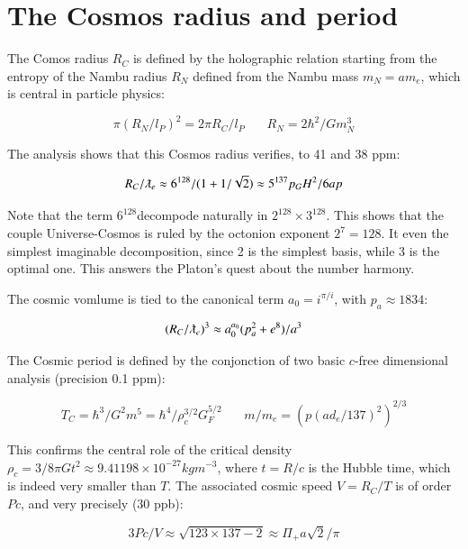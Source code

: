 \documentclass[a4paper,9pt]{article}
\begin{document}
\section{The Cosmos radius and period}

The Comos radius $R_C$ is defined by the holographic relation starting from the entropy of the Nambu radius $R_N$ defined from the Nambu mass $m_N = am_e$, which is central in particle physics:

\begin{equation}
\pi (R_N/l_P)^2 = 2\pi R_C/l_P ~~~~~~~~   R_N = 2\hbar^2/ Gm_N^3
\end{equation}

The analysis shows that this Cosmos radius verifies, to 41 and 38 ppm:

\begin{equation}
R_C/\lambdabar_e \approx 6^{128}/(1+1/\sqrt2) \approx 5^{137} p_GH^2/6ap
\end{equation}

Note that the term $6^{128}$decompode naturally in $2^{128} \times 3^{128}$. This shows that the couple Universe-Cosmos is ruled by the octonion exponent $2^7 = 128$. It even the simplest imaginable decomposition, since 2 is the simplest basis, while 3 is the optimal one. This answers the Platon's quest about the number harmony. 


The cosmic vomlume is tied to the canonical term $a_0 = i^{\pi/i}$, with $p_a\approx 1834$:

\begin{equation}
(R_C/\lambdabar_e)^3 \approx a_0^{a_0} (p_a^2 + e^8)/a^3
\end{equation}

The Cosmic period is defined by the conjonction of two basic $c$-free dimensional analysis (precision 0.1 ppm):

\begin{equation}
T_C = \hbar^3/G^2m^5 = \hbar^4/\rho_c^{3/2}G_F^{5/2} ~~~~~~~~   m/m_e = (p(ad_e/137)^2)^{2/3}
\end{equation}

This confirms the central role of the critical density $\rho_c = 3/8 \pi G t^2 \approx 9.41198 \times 10^{-27} kg m^{-3}$, where $t = R/c$ is the Hubble time, which is indeed very smaller than $T$. The associated cosmic speed $V = R_C/T$ is of order $Pc$, and very precisely (30 ppb):


\begin{equation}
3Pc/V \approx \sqrt{123 \times 137 - 2} \approx \Pi_+ a \sqrt {2} / \pi  
\end{equation}
\end{document}

